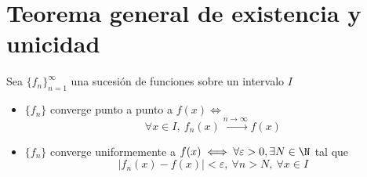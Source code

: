 \hypertarget{teorema-general-de-existencia-y-unicidad}{%
\section{Teorema general de existencia y
unicidad}\label{teorema-general-de-existencia-y-unicidad}}

Sea \(\{f_n\}_{n=1}^\infty\) una sucesión de funciones sobre un
intervalo \(I\)

\begin{itemize}
\item
  \(\{f_n\}\) converge punto a punto a \(f(x) \iff\)
  \[\forall x \in I,\ f_n(x) \xrightarrow{n\to \infty} f(x)\]
\item
  \(\{f_n\}\) converge uniformemente a
  \(f(x) \iff \forall \varepsilon > 0, \exists N \in \N\) tal que
  \[|f_n(x) - f(x)| < \varepsilon,\ \forall n > N,\ \forall x \in I\]
\end{itemize}

